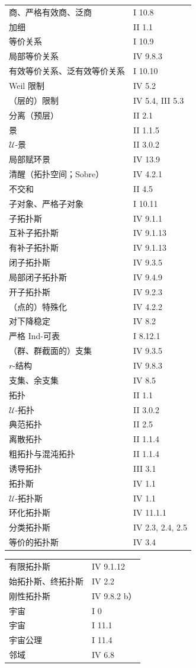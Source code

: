 \begin{longtable}{@{}p{}p{}@{}}
商、严格有效商、泛商 & I 10.8\\[3pt]
加细 & II 1.1\\
等价关系 & I 10.9\\
局部等价关系 & IV 9.8.3\\
有效等价关系、泛有效等价关系 & I 10.10\\
Weil 限制 & IV 5.2\\
（层的）限制 & IV 5.4, III 5.3\\[3pt]
分离（预层） & II 2.1\\
景 & II 1.1.5\\
$\mathcal U$-景 & II 3.0.2\\
局部赋环景 & IV 13.9\\
清醒（拓扑空间；Sobre） & IV 4.2.1\\
不交和 & II 4.5\\
子对象、严格子对象 & I 10.11\\
子拓扑斯 & IV 9.1.1\\
互补子拓扑斯 & IV 9.1.13\\
有补子拓扑斯 & IV 9.1.13\\
闭子拓扑斯 & IV 9.3.5\\
局部闭子拓扑斯 & IV 9.4.9\\
开子拓扑斯 & IV 9.2.3\\
（点的）特殊化 & IV 4.2.2\\
对下降稳定 & IV 8.2\\
严格 Ind-可表 & I 8.12.1\\
（群、群截面的）支集 & IV 9.3.5\\
$r$-结构 & IV 9.8.3\\
支集、余支集 & IV 8.5\\[3pt]
拓扑 & II 1.1\\
$\mathcal U$-拓扑 & II 3.0.2\\
典范拓扑 & II 2.5\\
离散拓扑 & II 1.1.4\\
粗拓扑与混沌拓扑 & II 1.1.4\\
诱导拓扑 & III 3.1\\
拓扑斯 & IV 1.1\\
$\mathcal U$-拓扑斯 & IV 1.1\\
环化拓扑斯 & IV 11.1.1\\
分类拓扑斯 & IV 2.3, 2.4, 2.5\\
等价的拓扑斯 & IV 3.4\\
\end{longtable}
\begin{longtable}{@{}p{}p{}@{}}
有限拓扑斯 & IV 9.1.12\\
始拓扑斯、终拓扑斯 & IV 2.2\\
刚性拓扑斯 & IV 9.8.2 b）\\[3pt]
宇宙 & I $0$\\
宇宙 & I 11.1\\
宇宙公理 & I 11.4\\[3pt]
邻域 & IV 6.8\\
\end{longtable}


